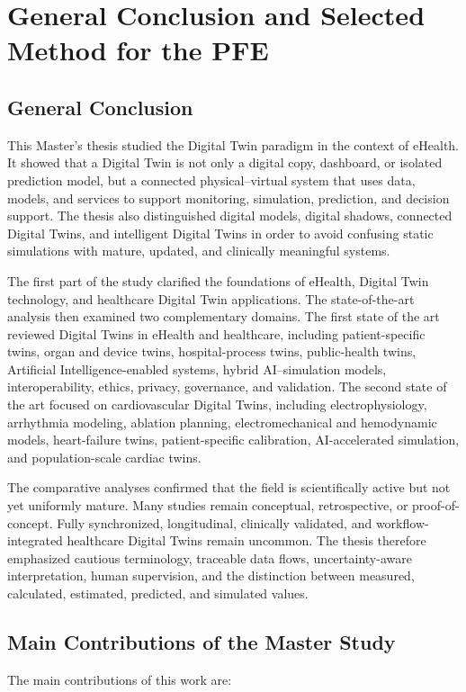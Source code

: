 \chapter{General Conclusion and Selected Method for the PFE}

\section{General Conclusion}
This Master’s thesis studied the Digital Twin paradigm in the context of eHealth. It showed that a Digital Twin is not only a digital copy, dashboard, or isolated prediction model, but a connected physical--virtual system that uses data, models, and services to support monitoring, simulation, prediction, and decision support. The thesis also distinguished digital models, digital shadows, connected Digital Twins, and intelligent Digital Twins in order to avoid confusing static simulations with mature, updated, and clinically meaningful systems.

The first part of the study clarified the foundations of eHealth, Digital Twin technology, and healthcare Digital Twin applications. The state-of-the-art analysis then examined two complementary domains. The first state of the art reviewed Digital Twins in eHealth and healthcare, including patient-specific twins, organ and device twins, hospital-process twins, public-health twins, Artificial Intelligence-enabled systems, hybrid AI--simulation models, interoperability, ethics, privacy, governance, and validation. The second state of the art focused on cardiovascular Digital Twins, including electrophysiology, arrhythmia modeling, ablation planning, electromechanical and hemodynamic models, heart-failure twins, patient-specific calibration, AI-accelerated simulation, and population-scale cardiac twins.

The comparative analyses confirmed that the field is scientifically active but not yet uniformly mature. Many studies remain conceptual, retrospective, or proof-of-concept. Fully synchronized, longitudinal, clinically validated, and workflow-integrated healthcare Digital Twins remain uncommon. The thesis therefore emphasized cautious terminology, traceable data flows, uncertainty-aware interpretation, human supervision, and the distinction between measured, calculated, estimated, predicted, and simulated values.

\section{Main Contributions of the Master Study}
The main contributions of this work are:

